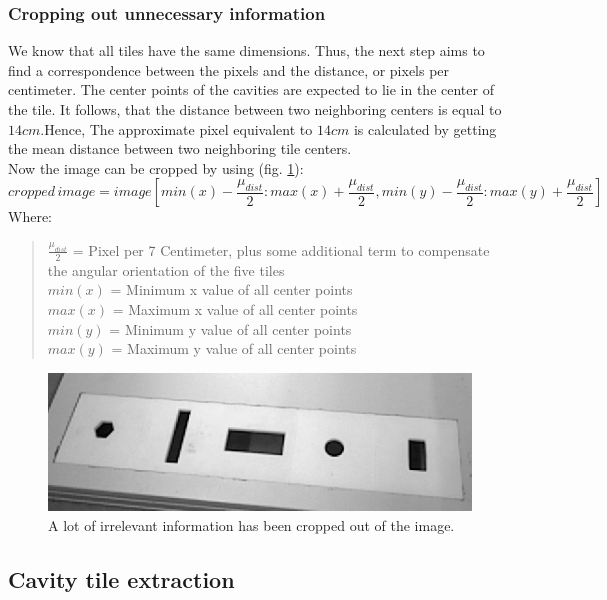 \documentclass{article}
\begin{document}
\subsubsection*{Cropping out unnecessary information}
We know that all tiles have the same dimensions. Thus, the next step aims to find a correspondence between the pixels and the distance, or pixels per centimeter. The center points of the cavities are expected to lie in the center of the tile. It follows, that the distance between two neighboring centers is equal to $14cm$.Hence, The approximate pixel equivalent to $14cm$ is calculated by getting the mean distance between two neighboring tile centers.\\
Now the image can be cropped by using (fig. \ref{fig:cropped}):
\begin{equation}
cropped \, image = image[min(x)-\frac{\mu_{dist}}{2}:max(x)+\frac{\mu_{dist}}{2},min(y)-\frac{\mu_{dist}}{2}:max(y)+\frac{\mu_{dist}}{2}]
\end{equation}
Where:
\begin{quote}
$\frac{\mu_{dist}}{2}$ = Pixel per 7 Centimeter, plus some additional term to compensate the angular orientation of the five tiles\\
$min(x)$ = Minimum x value of all center points\\
$max(x)$ = Maximum x value of all center points\\
$min(y)$ = Minimum y value of all center points\\
$max(y)$ = Maximum y value of all center points\\
\end{quote}
\begin{figure}[h!]
\centering
\includegraphics[scale=0.3]{images/cropped.jpg}
\caption{A lot of irrelevant information has been cropped out of the image.}
\label{fig:cropped}
\end{figure}

\subsection{Cavity tile extraction}
\end{document}
